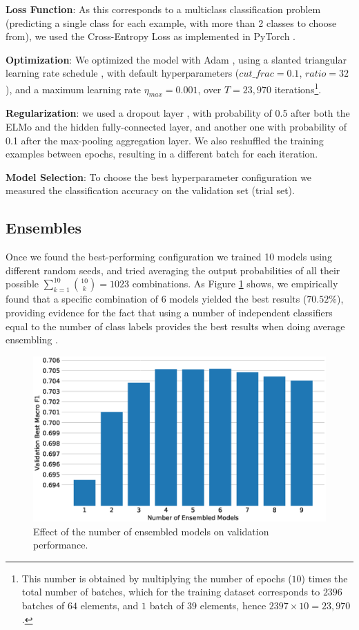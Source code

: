 \documentclass[11pt,a4paper]{article}
\begin{document}
\textbf{Loss Function}: As this corresponds to a multiclass classification problem (predicting a single class for each example, with more than 2 classes to choose from), we used the Cross-Entropy Loss as implemented in PyTorch \cite{paszke2017automatic}.

\textbf{Optimization}: We optimized the model with Adam \cite{DBLP:journals/corr/KingmaB14}, using a slanted triangular learning rate schedule \cite{howard2018universal}, with default hyperparameters ($cut\_frac=0.1$, $ratio=32$), and a maximum learning rate $\eta_{max}=0.001$, over $T=23,970$ iterations\footnote{This number is obtained by multiplying the number of epochs ($10$) times the total number of batches, which for the training dataset corresponds to $2396$ batches of $64$ elements, and $1$ batch of $39$ elements, hence $2397\times10=23,970$.}.

\textbf{Regularization}: we used a dropout layer \cite{srivastava2014dropout}, with probability of 0.5 after both the ELMo and the hidden fully-connected layer, and another one with probability of 0.1 after the max-pooling aggregation layer. We also reshuffled the training examples between epochs, resulting in a different batch for each iteration. 

\textbf{Model Selection}: To choose the best hyperparameter configuration we measured the classification accuracy on the validation set (trial set). 


\subsection{Ensembles}
 
Once we found the best-performing configuration we trained 10 models using different random seeds, and tried averaging the output probabilities of all their possible $\sum_{k=1}^{10}{\binom{10}{k}}=1023$ combinations. As Figure \ref{fig:best_ensembles} shows, we empirically found that a specific combination of $6$ models yielded the best results ($70.52\%$), providing evidence for the fact that using a number of independent classifiers equal to the number of class labels provides the best results when doing average ensembling \cite{bonab2016theoretical}.


\begin{figure}[!h]
    \centering
    \includegraphics[width=\columnwidth]{images/best_ensembles.eps}
\caption{Effect of the number of ensembled models on validation performance.}
\label{fig:best_ensembles}
\end{figure}
\end{document}
